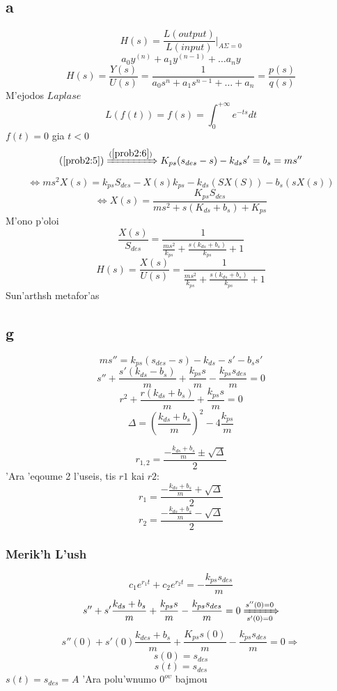\documentclass[a4paper]{article}
\begin{document}
        \subsection{a}
        \[H(s)=\frac{L(output)}{L(input)}\rvert _{A\Sigma=0}\]
        \[a_0y^{(n)}+a_1y^{(n-1)}+\dots a_ny\]
        \[H(s)=\frac{Y(s)}{U(s)}=\frac{1}{a_0s^n+a_1s^{n-1}+\dots+a_n}=\frac{p(s)}{q(s)}\]
        M'ejodos $Laplase$
        \[L(f(t))=f(s)=\int_0^{+\infty}e^{-ts}dt\]
        $f(t)=0$ gia $t<0$
        \[(\ref{prob2:5}) \xRightarrow{(\ref{prob2:6})}K_{ps}(s_{des}-s)-k_{ds}s'=b_s=ms''\]
        \[\Leftrightarrow ms^2X(s)=k_{ps}S_{des}-X(s)k_{ps}-k_{ds}(SX(S))-b_s(sX(s))\]
        \[\Leftrightarrow X(s)=\frac{K_{ps}S_{des}}{ms^2+s(K_{ds}+b_s)+K_{ps}}\]
        \hfill M'ono p'oloi
        \[\frac{X(s)}{S_{des}}=\frac{1}{\frac{ms^2}{k_{ps}}+\frac{s(k_{ds}+b_s)}{k_{ps}}+1}\]
        \[H(s)=\frac{X(s)}{U(s)}=\frac{1}{\frac{ms^2}{k_{ps}}+\frac{s(k_{ds}+b_s)}{k_{ps}}+1}\]\hfill Sun'arthsh metafor'as

        \subsection{g}
        \[ms''=k_{ps}(s_{des}-s)-k_{ds}-s'-b_ss'\]
        \[s''+\frac{s'(k_{ds}-b_s)}{m}+\frac{k_{ps}s}{m}-\frac{k_{ps}s_{des}}{m}=0\]
        \[r^2+\frac{r(k_{ds}+b_s)}{m}+\frac{k_{ps}s}{m}=0\]
        \[\Delta=(\frac{k_{ds}+b_s}{m})^2-4\frac{k_{ps}}{m}\]
        
        \[r_{1,2}=\frac{-\frac{k_{ds}+b_s}{m}\pm\sqrt{\Delta}}{2}\]
        'Ara 'eqoume 2 l'useis, tis $r1$ kai $r2$:
        \[r_1=\frac{-\frac{k_{ds}+b_s}{m}+\sqrt{\Delta}}{2}\]
        \[r_2=\frac{-\frac{k_{ds}+b_s}{m}-\sqrt{\Delta}}{2}\]
        \subsubsection{Merik'h L'ush}
        \[c_1e^{r_1t}+c_2e^{r_2t}=-\frac{k_{ps}s_{des}}{m}\]
        \[s''+s'\frac{k_{ds}+b_s}{m}+\frac{k_{ps}s}{m}-\frac{k_{ps}s_{des}}{m}=0\xRightarrow[s'(0)=0]{s''(0)=0}\]
        \[s''(0)+s'(0)\frac{k_{des}+b_s}{m}+\frac{K_{ps}s(0)}{m}-\frac{k_{ps}s_{des}}{m}=0\Rightarrow\]
        \[s(0)=s_{des}\]
        \[s(t)=s_{des}\]
        $s(t)=s_{des}=A$ 'Ara polu'wnumo $0^{o\upsilon}$ bajmou
\end{document}
